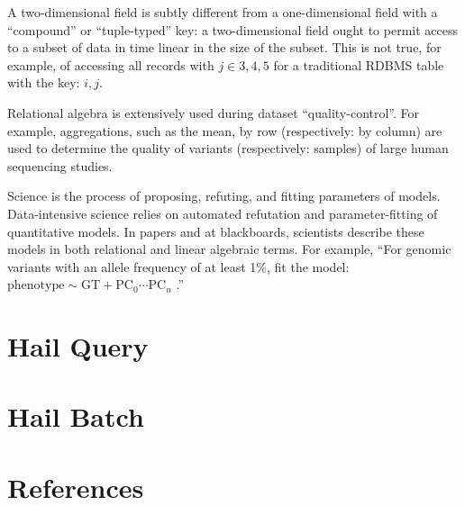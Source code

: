 \documentclass[10pt]{article}
\begin{document}
A two-dimensional field is subtly different from a one-dimensional field with a ``compound'' or ``tuple-typed'' key: a two-dimensional field ought to permit access to a subset of data in time linear in the size of the subset. This is not true, for example, of accessing all records with $j \in {3, 4, 5}$ for a traditional RDBMS table with the key: $i, j$.

Relational algebra is extensively used during dataset ``quality-control''. For example, aggregations, such as the mean, by row (respectively: by column) are used to determine the quality of variants (respectively: samples) of large human sequencing studies.

Science is the process of proposing, refuting, and fitting parameters of models. Data-intensive science relies on automated refutation and parameter-fitting of quantitative models. In papers and at blackboards, scientists describe these models in both relational and linear algebraic terms. For example, ``For genomic variants with an allele frequency of at least 1\%, fit the model: %
%
$\mathrm{phenotype} \sim \mathrm{GT} + \mathrm{PC}_0 \cdots \mathrm{PC}_n$%
%
.''



\section{Hail Query}

\section{Hail Batch}

\cite{dremel}
\cite{numpywren}
\cite{rdd}

\section{References}
\printbibliography
\end{document}
